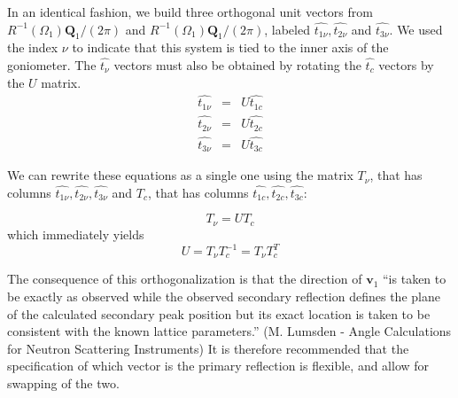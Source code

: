 \documentclass[prb]{revtex4}%
\begin{document}
In an identical fashion, we build three orthogonal unit vectors from $R^{-1}(\Omega_1)\textbf{Q}_1/(2\pi)$ and $R^{-1}(\Omega_1)\textbf{Q}_1/(2\pi)$, labeled $\widehat{t_{1\nu}}, \widehat{t_{2\nu}}$
and $\widehat{t_{3\nu}}$. We used the index $\nu$ to indicate that this system is tied to the inner axis
of the goniometer. The $\widehat{t_{\nu}}$ vectors must also be obtained by rotating the $\widehat{t_c}$ vectors
by the $U$ matrix.
\begin{eqnarray}
  \nonumber \widehat{t_{1\nu}}&=& U \widehat{t_{1c}} \\
  \widehat{t_{2\nu}}&=& U \widehat{t_{2c}} \\
  \nonumber \widehat{t_{3\nu}}&=& U \widehat{t_{3c}}
\end{eqnarray}

We can rewrite these equations as a single one using the matrix $T_{\nu}$, that has columns
$\widehat{t_{1\nu}},\widehat{t_{2\nu}}, \widehat{t_{3\nu}}$ and $T_c$, that has columns
$\widehat{t_{1c}},\widehat{t_{2c}}, \widehat{t_{3c}}$:

\begin{equation}
    T_{\nu}=U T_c
\end{equation}
which immediately yields
\begin{equation}
    U = T_{\nu}T_c^{-1} = T_{\nu}T_c^{T}
\end{equation}

The consequence of this orthogonalization is that the direction of $\textbf{v}_1$
``is taken to be exactly as observed while the observed secondary reflection defines the plane
of the calculated secondary peak position but its exact location is taken to be consistent with
the known lattice parameters.'' (M. Lumsden - Angle Calculations for Neutron Scattering Instruments)
It is therefore recommended that the specification of which vector is the primary reflection is flexible,
and allow for swapping of the two.
\end{document}
